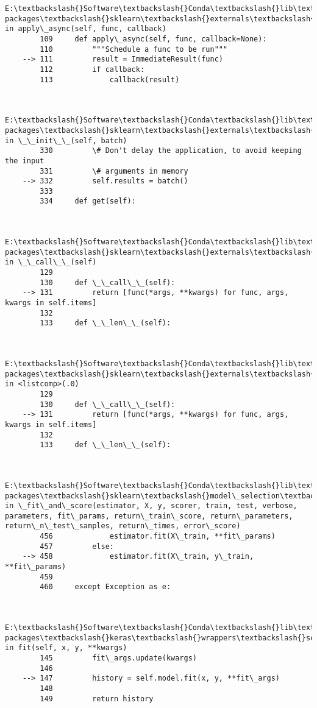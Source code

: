 \documentclass[11pt]{article}
\begin{document}
\begin{Verbatim}[commandchars=\\\{\}]
        E:\textbackslash{}Software\textbackslash{}Conda\textbackslash{}lib\textbackslash{}site-packages\textbackslash{}sklearn\textbackslash{}externals\textbackslash{}joblib\textbackslash{}\_parallel\_backends.py in apply\_async(self, func, callback)
        109     def apply\_async(self, func, callback=None):
        110         """Schedule a func to be run"""
    --> 111         result = ImmediateResult(func)
        112         if callback:
        113             callback(result)
    

        E:\textbackslash{}Software\textbackslash{}Conda\textbackslash{}lib\textbackslash{}site-packages\textbackslash{}sklearn\textbackslash{}externals\textbackslash{}joblib\textbackslash{}\_parallel\_backends.py in \_\_init\_\_(self, batch)
        330         \# Don't delay the application, to avoid keeping the input
        331         \# arguments in memory
    --> 332         self.results = batch()
        333 
        334     def get(self):
    

        E:\textbackslash{}Software\textbackslash{}Conda\textbackslash{}lib\textbackslash{}site-packages\textbackslash{}sklearn\textbackslash{}externals\textbackslash{}joblib\textbackslash{}parallel.py in \_\_call\_\_(self)
        129 
        130     def \_\_call\_\_(self):
    --> 131         return [func(*args, **kwargs) for func, args, kwargs in self.items]
        132 
        133     def \_\_len\_\_(self):
    

        E:\textbackslash{}Software\textbackslash{}Conda\textbackslash{}lib\textbackslash{}site-packages\textbackslash{}sklearn\textbackslash{}externals\textbackslash{}joblib\textbackslash{}parallel.py in <listcomp>(.0)
        129 
        130     def \_\_call\_\_(self):
    --> 131         return [func(*args, **kwargs) for func, args, kwargs in self.items]
        132 
        133     def \_\_len\_\_(self):
    

        E:\textbackslash{}Software\textbackslash{}Conda\textbackslash{}lib\textbackslash{}site-packages\textbackslash{}sklearn\textbackslash{}model\_selection\textbackslash{}\_validation.py in \_fit\_and\_score(estimator, X, y, scorer, train, test, verbose, parameters, fit\_params, return\_train\_score, return\_parameters, return\_n\_test\_samples, return\_times, error\_score)
        456             estimator.fit(X\_train, **fit\_params)
        457         else:
    --> 458             estimator.fit(X\_train, y\_train, **fit\_params)
        459 
        460     except Exception as e:
    

        E:\textbackslash{}Software\textbackslash{}Conda\textbackslash{}lib\textbackslash{}site-packages\textbackslash{}keras\textbackslash{}wrappers\textbackslash{}scikit\_learn.py in fit(self, x, y, **kwargs)
        145         fit\_args.update(kwargs)
        146 
    --> 147         history = self.model.fit(x, y, **fit\_args)
        148 
        149         return history
    


\end{Verbatim}
\end{document}
